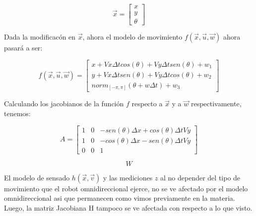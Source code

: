 $$\overrightarrow{x} = \begin{bmatrix}
         x \\
         y \\
         \theta 
        \end{bmatrix}$$

Dada la modificacón en $\overrightarrow{x}$, ahora el modelo de movimiento $f(\overrightarrow{x},\overrightarrow{u}, \overrightarrow{w})$ ahora pasará a ser:

$$f(\overrightarrow{x},\overrightarrow{u}, \overrightarrow{w})= \begin{bmatrix}
         x + Vx \Delta t cos(\theta) + Vy \Delta t sen(\theta) + w_1 \\
         y + Vx \Delta t sen(\theta) + Vy \Delta t cos(\theta) + w_2 \\
         norm_{[-\pi,\pi]} (\theta + w \Delta t) + w_3
         \end{bmatrix}$$

Calculando los jacobianos de la función $f$ respecto a $\overrightarrow{x}$ y a $\overrightarrow{w}$ respectivamente, tenemos:

$$A= \begin{bmatrix}
         1 & 0 & -sen(\theta)\Delta x + cos(\theta) \Delta t V y\\
         1 & 0 & -cos(\theta)\Delta x - sen(\theta) \Delta t V y \\
         0 & 0 & 1
         \end{bmatrix}$$

$$W$$

El modelo de sensado $h(\overrightarrow{x},\overrightarrow{v})$ y las mediciones $z$ al no depender del tipo de movimiento que el robot omnidireccional ejerce, no se ve afectado por el modelo omnidireccional asi que permanecen como vimos previamente en la materia. Luego, la matriz Jacobiana H tampoco se ve afectada con respecto a lo que visto.